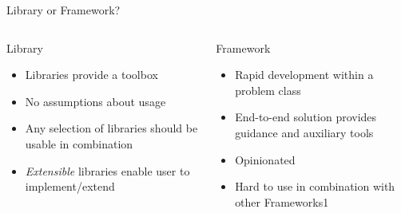 \documentclass{beamer}
\begin{document}
\begin{frame}{Library or Framework?}
  \begin{columns}
    \begin{column}{0.5\textwidth}
      \begin{block}{Library}
        \begin{itemize}
        \item Libraries provide a toolbox
        \item No assumptions about usage
        \item Any selection of libraries should be usable in combination
        \item \textit{Extensible} libraries enable user to implement/extend
        \end{itemize}
      \end{block}
    \end{column}
    \begin{column}{0.5\textwidth}
      \begin{block}{Framework}
        \begin{itemize}
        \item Rapid development within a problem class
        \item End-to-end solution provides guidance and auxiliary tools
        \item Opinionated
        \item Hard to use in combination with other Frameworks1
        \end{itemize}
      \end{block}
    \end{column}
  \end{columns}
  \begin{center}
  \end{center}
\end{frame}
\end{document}
